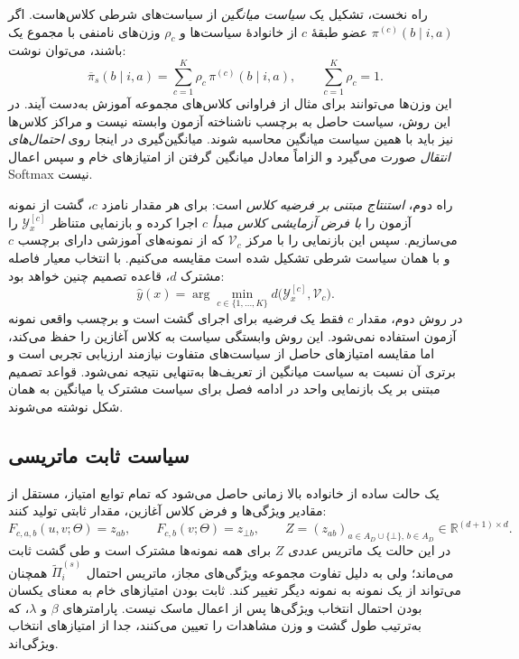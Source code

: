 راه نخست، تشکیل یک \emph{سیاست میانگین} از سیاست‌های شرطی کلاس‌هاست. اگر $\pi^{(c)}(b\mid i,a)$ عضو طبقهٔ $c$ از خانوادهٔ سیاست‌ها و $\rho_{c}$ وزن‌های نامنفی با مجموع یک باشند، می‌توان نوشت:
\begin{equation}\label{eq:ch3-mean-policy-inference}
\overline\pi_s(b\mid i,a)=
\sum_{c=1}^{K}\rho_{c}\,\pi^{(c)}(b\mid i,a),
\qquad \sum_{c=1}^{K}\rho_{c}=1.
\end{equation}
این وزن‌ها می‌توانند برای مثال از فراوانی کلاس‌های مجموعه آموزش به‌دست آیند. در این روش، سیاست حاصل به برچسب ناشناخته آزمون وابسته نیست و مراکز کلاس‌ها نیز باید با همین سیاست میانگین محاسبه شوند. میانگین‌گیری در اینجا روی \emph{احتمال‌های انتقال} صورت می‌گیرد و الزاماً معادل میانگین گرفتن از امتیازهای خام و سپس اعمال Softmax نیست.

راه دوم، \emph{استنتاج مبتنی بر فرضیه کلاس} است: برای هر مقدار نامزد $c$، گشت از نمونه آزمون را \emph{با فرض آزمایشی کلاس مبدأ $c$} اجرا کرده و بازنمایی متناظر $\mathscr Y_x^{[c]}$ را می‌سازیم. سپس این بازنمایی را با مرکز $\mathcal V_c$ که از نمونه‌های آموزشی دارای برچسب $c$ و با همان سیاست شرطی تشکیل شده است مقایسه می‌کنیم. با انتخاب معیار فاصله مشترک $d$، قاعده تصمیم چنین خواهد بود:
\begin{equation}\label{eq:ch3-class-hypothesis-inference}
\widehat y(x)=\arg\min_{c\in\{1,\ldots,K\}}
d\bigl(\mathscr Y_x^{[c]},\mathcal V_c\bigr).
\end{equation}
در روش دوم، مقدار $c$ فقط یک \emph{فرضیه} برای اجرای گشت است و برچسب واقعی نمونه آزمون استفاده نمی‌شود. این روش وابستگی سیاست به کلاس آغازین را حفظ می‌کند، اما مقایسه امتیازهای حاصل از سیاست‌های متفاوت نیازمند ارزیابی تجربی است و برتری آن نسبت به سیاست میانگین از تعریف‌ها به‌تنهایی نتیجه نمی‌شود. قواعد تصمیم مبتنی بر یک بازنمایی واحد در ادامه فصل برای سیاست مشترک یا میانگین به همان شکل نوشته می‌شوند.

\subsection{سیاست ثابت ماتریسی}
\label{subsec:ch3-shared-matrix-policy}
یک حالت ساده از خانواده بالا زمانی حاصل می‌شود که تمام توابع امتیاز،
مستقل از مقادیر ویژگی‌ها و فرض کلاس آغازین، مقدار ثابتی تولید کنند:
\begin{equation}\label{eq:ch3-fixed-policy-matrix}
F_{c,a,b}(u,v;\Theta)=z_{ab},\qquad
F_{c,b}(v;\Theta)=z_{\bot b},\qquad
Z=(z_{ab})_{
a\in A_D\cup\{\bot\},\,b\in A_D}
\in\mathbb R^{(d+1)\times d}.
\end{equation}
در این حالت یک ماتریس \emph{عددی} $Z$ برای همه نمونه‌ها مشترک
است و طی گشت ثابت می‌ماند؛ ولی به دلیل تفاوت مجموعه ویژگی‌های مجاز،
ماتریس احتمال $\widetilde\Pi_i^{(s)}$ همچنان می‌تواند از یک نمونه به
نمونه دیگر تغییر کند. ثابت بودن امتیازهای خام به معنای یکسان
بودن احتمال انتخاب ویژگی‌ها پس از اعمال ماسک نیست.
پارامترهای $\beta$ و $\lambda$، که به‌ترتیب طول گشت و وزن مشاهدات
را تعیین می‌کنند، جدا از امتیازهای انتخاب ویژگی‌اند.


